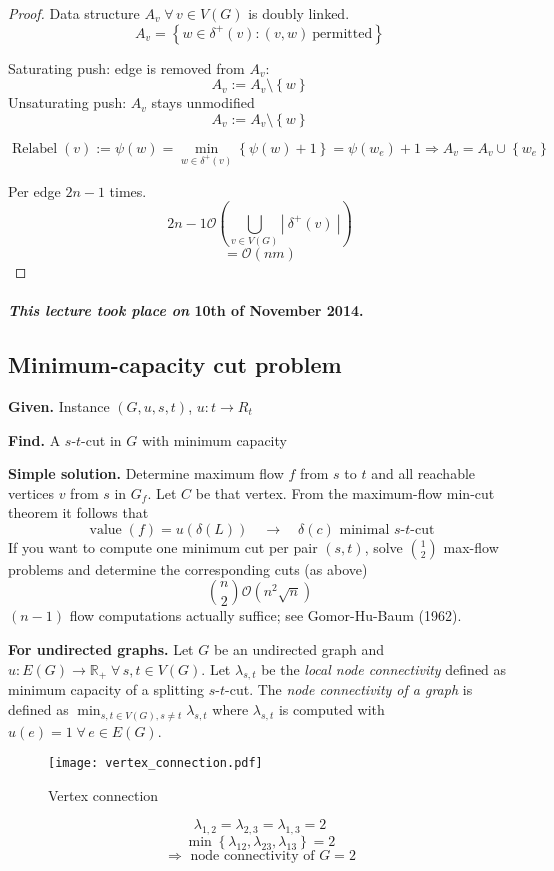 \documentclass{article}
\newcommand{\card}[1]{\left|\:\!#1\:\!\right|}
\newcommand{\set}[1]{\left\{#1\right\}}
\newcommand{\given}[1]{\textbf{Given.} #1\par}
\newcommand{\find}[1]{\textbf{Find.} #1\par}
\newcommand{\dateref}[1]{\paragraph{\textit{This lecture took place on} #1.}}
\newcommand{\fall}{\;\forall\,}
\begin{document}
\begin{proof}
  Data structure $A_v \fall v \in V(G)$ is doubly linked.
  \[ A_v = \set{w \in \delta^+(v): (v, w)\ \text{permitted}} \]

  Saturating push: edge is removed from $A_v$:
  \[ A_v := A_v \setminus \set{w} \]
  Unsaturating push: $A_v$ stays unmodified
  \[ A_v := A_v \setminus \set{w} \]

  \[
    \operatorname{Relabel}(v) := \psi(w) = \min_{w\in\delta^+(v)}{\set{\psi(w) + 1}}
      = \psi(w_e) + 1
      \Rightarrow A_v = A_v \cup \set{w_e}
  \]

  Per edge $2n-1$ times.
  \[ 2n-1 \mathcal{O}(\bigcup_{v \in V(G)} \card{\delta^+(v)}) \]
  \[ = \mathcal{O}(nm) \]
\end{proof}

\dateref{10th of November 2014}

\subsection{Minimum-capacity cut problem}
\label{section-4.5}
%
\given{Instance $(G, u, s, t)$, $u: t \rightarrow R_t$}
\find{A $s$-$t$-cut in $G$ with minimum capacity}

\textbf{Simple solution.}
  Determine maximum flow $f$ from $s$ to $t$ and all reachable vertices $v$ from $s$ in $G_f$.
  Let $C$ be that vertex. From the maximum-flow min-cut theorem it follows that
  \[
    \operatorname{value}(f) = u(\delta(L)) \quad\rightarrow\quad \delta(c) \text{ minimal $s$-$t$-cut}
  \]
  If you want to compute one minimum cut per pair $(s, t)$, solve ${1 \choose 2}$ max-flow problems
  and determine the corresponding cuts (as above)
  \[
    {n \choose 2} \mathcal{O}(n^2 \sqrt{n})
  \]
  $(n-1)$ flow computations actually suffice; see Gomor-Hu-Baum (1962).

\textbf{For undirected graphs.}
  Let $G$ be an undirected graph and $u: E(G) \rightarrow \mathbb{R}_+ \fall s, t \in V(G)$.
  Let $\lambda_{s,t}$ be the \emph{local node connectivity} defined as minimum capacity of a splitting $s$-$t$-cut. The \emph{node connectivity of a graph} is defined as $\min_{s, t \in V(G), s \neq t} \lambda_{s,t}$ where $\lambda_{s,t}$ is computed with $u(e) = 1 \fall e \in E(G)$.

\begin{figure}[h]
 \begin{center}
  \texttt{[image: vertex\_connection.pdf]}
  \caption{Vertex connection}
 \end{center}
\end{figure}
\[
  \lambda_{1,2} = \lambda_{2,3} = \lambda_{1,3} = 2
\] \[
  \min{\set{\lambda_{12}, \lambda_{23}, \lambda_{13}}} = 2
\] \[
  \Rightarrow \text{ node connectivity of } G = 2
\]
\end{document}

